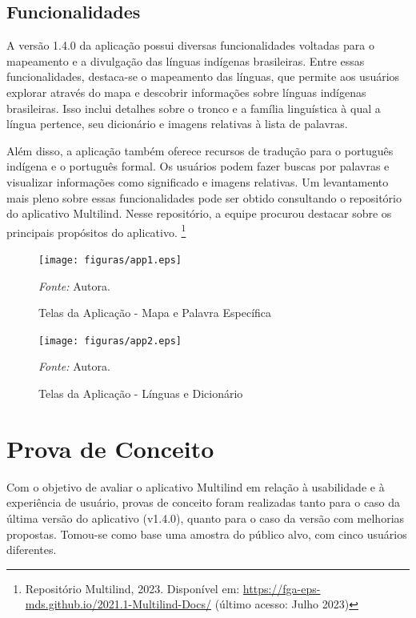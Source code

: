 \subsection{Funcionalidades}
\label{Funcionalidades}
A versão 1.4.0 da aplicação possui diversas funcionalidades voltadas para o mapeamento e a divulgação das línguas indígenas brasileiras. Entre essas funcionalidades, destaca-se o mapeamento das línguas, que permite aos usuários 
explorar através do mapa e descobrir informações sobre línguas indígenas brasileiras. Isso inclui detalhes sobre o tronco e a família linguística à qual a língua pertence, seu dicionário e imagens relativas à lista de palavras.

Além disso, a aplicação também oferece recursos de tradução para o português indígena e o português formal. Os usuários podem fazer buscas por palavras e visualizar informações como significado e imagens relativas. Um levantamento 
mais pleno sobre essas funcionalidades pode ser obtido consultando o repositório do aplicativo Multilind. Nesse repositório, a equipe procurou destacar sobre os principais propósitos do aplicativo. \footnote{Repositório Multilind, 2023. Disponível
em: \url{https://fga-eps-mds.github.io/2021.1-Multilind-Docs/} (último acesso: Julho 2023)}

\begin{figure}[h!]
	\centering
	\caption{Telas da Aplicação - Mapa e Palavra Específica}
	\begin{adjustbox}{center}
		\texttt{[image: figuras/app1.eps]}
	\end{adjustbox}
	\begin{tablenotes}[flushleft]
		\centering
		\item \textit{Fonte:} Autora.
	\end{tablenotes}
	\label{fig18}
\end{figure}

\begin{figure}[h!]
	\centering
	\caption{Telas da Aplicação - Línguas e Dicionário}
	\begin{adjustbox}{center}
		\texttt{[image: figuras/app2.eps]}
	\end{adjustbox}
	\begin{tablenotes}[flushleft]
		\centering
		\item \textit{Fonte:} Autora.
	\end{tablenotes}
	\label{fig19}
\end{figure}


\section{Prova de Conceito}
\label{sec:Prova de Conceito}
Com o objetivo de avaliar o aplicativo Multilind em relação à usabilidade e à experiência de usuário, provas de conceito foram 
realizadas tanto para o caso da última versão do aplicativo (v1.4.0), quanto para o caso da versão com melhorias propostas. Tomou-se como base uma amostra do público alvo, com cinco 
usuários diferentes.

